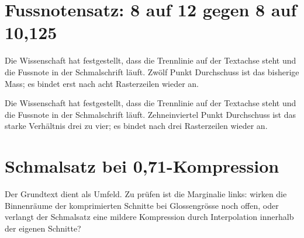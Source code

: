\documentclass{swisstex}
\begin{document}
\section{Fussnotensatz: 8 auf 12 gegen 8 auf 10{,}125}
{\condensed\fontsize{8}{12}\selectfont
Die Wissenschaft hat festgestellt, dass die Trennlinie auf der Textachse
steht und die Fussnote in der Schmalschrift läuft. Zwölf Punkt Durchschuss
ist das bisherige Mass; es bindet erst nach acht Rasterzeilen wieder an.\par}
{\condensed\fontsize{8}{10.125}\selectfont
Die Wissenschaft hat festgestellt, dass die Trennlinie auf der Textachse
steht und die Fussnote in der Schmalschrift läuft. Zehneinviertel Punkt
Durchschuss ist das starke Verhältnis drei zu vier; es bindet nach drei
Rasterzeilen wieder an.\par}
\section{Schmalsatz bei 0{,}71-Kompression}
Der Grundtext dient als Umfeld. Zu prüfen ist die Marginalie links: wirken
die Binnenräume der komprimierten Schnitte bei Glossengrösse noch offen,
oder verlangt der Schmalsatz eine mildere Kompression durch Interpolation
innerhalb der eigenen Schnitte?
\end{document}
